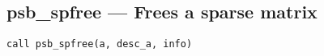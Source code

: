 





%
%
\clearpage\subsection{psb\_spfree --- Frees a sparse matrix}

\begin{verbatim}
call psb_spfree(a, desc_a, info)
\end{verbatim}

